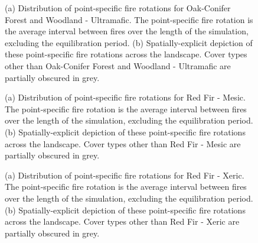 \begin{figure}[!htbp]
  \centering
  \caption{(a) Distribution of point-specific fire rotations for Oak-Conifer Forest and Woodland - Ultramafic. The point-specific fire rotation is the average interval between fires over the length of the simulation, excluding the equilibration period. (b) Spatially-explicit depiction of these point-specific fire rotations across the landscape. Cover types other than Oak-Conifer Forest and Woodland - Ultramafic are partially obscured in grey.}
\label{fig:preturn_ocfwu}
\end{figure}

\begin{figure}[!htbp]
  \centering
  \caption{(a) Distribution of point-specific fire rotations for Red Fir - Mesic. The point-specific fire rotation is the average interval between fires over the length of the simulation, excluding the equilibration period. (b) Spatially-explicit depiction of these point-specific fire rotations across the landscape. Cover types other than Red Fir - Mesic are partially obscured in grey.}
\label{fig:preturn_rfrm}
\end{figure}

\begin{figure}[!htbp]
  \centering
  \caption{(a) Distribution of point-specific fire rotations for Red Fir - Xeric. The point-specific fire rotation is the average interval between fires over the length of the simulation, excluding the equilibration period. (b) Spatially-explicit depiction of these point-specific fire rotations across the landscape. Cover types other than Red Fir - Xeric are partially obscured in grey.}
\label{fig:preturn_rfrx}
\end{figure}

